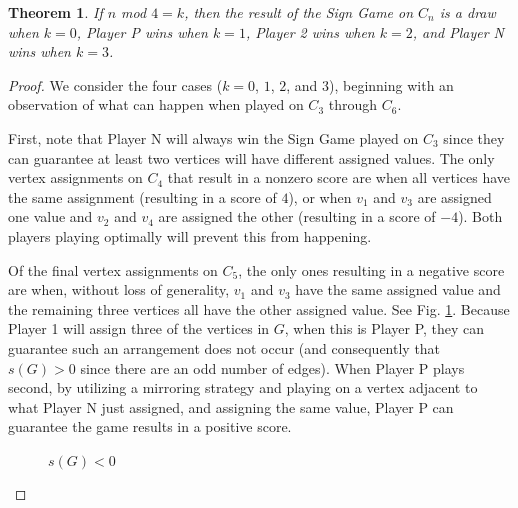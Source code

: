 \documentclass[amsart,11pt]{article}
\theoremstyle{dotless}
\theoremstyle{dotless}
\newtheorem{thm}{Theorem}[section]
\begin{document}
\begin{thm} \label{cycletheorem}
    If $n$ mod $4 =  k$, then the result of the Sign Game on $C_n$ is a draw when $k = 0$, Player P wins when $k = 1$, Player 2 wins when $k = 2$, and Player N wins when $k = 3$.
\end{thm}
\begin{proof}
    We consider the four cases ($k=0$, $1$, $2$, and $3$), beginning with an observation of what can happen when played on $C_3$ through $C_6$.

     First, note that Player N will always win the Sign Game played on $C_3$ since they can guarantee at least two vertices will have different assigned values. The only vertex assignments on $C_4$ that result in a nonzero score are when all vertices have the same assignment (resulting in a score of $4$), or when $v_1$ and $v_3$ are assigned one value and $v_2$ and $v_4$ are assigned the other (resulting in a score of $-4$). Both players playing optimally will prevent this from happening.

     Of the final vertex assignments on $C_5$, the only ones resulting in a negative score are when, without loss of generality, $v_1$ and $v_3$ have the same assigned value and the remaining three vertices all have the other assigned value. See Fig. \ref{c5base}. Because Player 1 will assign three of the vertices in $G$, when this is Player P, they can guarantee such an arrangement does not occur (and consequently that $s(G) > 0$ since there are an odd number of edges). When Player P plays second, by utilizing a mirroring strategy and playing on a vertex adjacent to what Player N just assigned, and assigning the same value, Player P can guarantee the game results in a positive score.

    
\begin{figure}[htb] 
\centering
{}
\caption{$s(G) < 0$}
\label{c5base}
\end{figure}


\end{proof}
\end{document}
